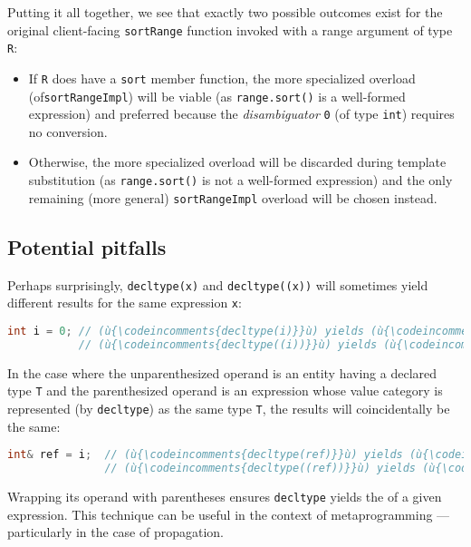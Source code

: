 Putting it all together, we see that exactly two possible
outcomes exist for the original client-facing \lstinline!sortRange! function
invoked with a range argument of type \lstinline!R!:

\begin{itemize}
\item{If \lstinline!R! does have a \lstinline!sort! member function, the more specialized overload (of\linebreak[4] \lstinline!sortRangeImpl!) will be viable (as \lstinline!range.sort()! is a well-formed expression) and preferred because the \emph{disambiguator} \lstinline!0! (of type \lstinline!int!) requires no conversion.}
\item{Otherwise, the more specialized overload will be discarded during template substitution (as \lstinline!range.sort()! is not a well-formed expression) and the only remaining (more general) \lstinline!sortRangeImpl! overload will be chosen instead.}
\end{itemize}

\subsection[Potential pitfalls]{Potential pitfalls}\label{potential-pitfalls}

Perhaps surprisingly, \lstinline!decltype(x)! and \lstinline!decltype((x))!
will sometimes yield different results for the same expression
\lstinline!x!:

\begin{lstlisting}[language=C++]
int i = 0; // (ù{\codeincomments{decltype(i)}}ù) yields (ù{\codeincomments{int}}ù).
           // (ù{\codeincomments{decltype((i))}}ù) yields (ù{\codeincomments{int\&}}ù).
\end{lstlisting}
    
\noindent In the case where the unparenthesized operand is an entity having a
declared type \lstinline!T! and the parenthesized operand is an expression
whose value category is represented (by \lstinline!decltype!) as the same
type \lstinline!T!, the results will coincidentally be the same:

\begin{lstlisting}[language=C++]
int& ref = i;  // (ù{\codeincomments{decltype(ref)}}ù) yields (ù{\codeincomments{int\&}}ù).
               // (ù{\codeincomments{decltype((ref))}}ù) yields (ù{\codeincomments{int\&}}ù).
\end{lstlisting}
    
\noindent Wrapping its operand with parentheses ensures \lstinline!decltype! yields
the  of a given expression. This technique can be
useful in the context of metaprogramming --- particularly in the case of
 propagation.

